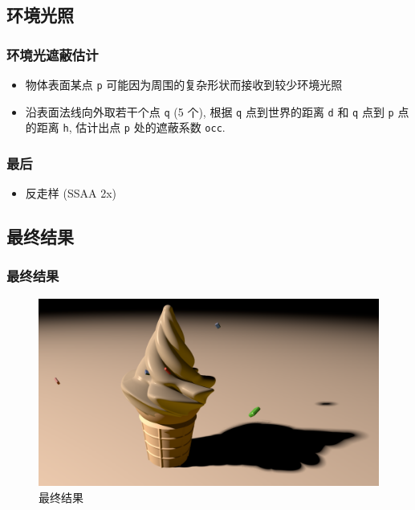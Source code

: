 \documentclass[aspectratio=169]{ctexbeamer} %
\begin{document}
\subsection{环境光照}
\begin{frame}
    \frametitle{环境光遮蔽估计}
    \begin{itemize}[<+->]
        \item 物体表面某点 \texttt{p} 可能因为周围的复杂形状而接收到较少环境光照
        \item 沿表面法线向外取若干个点 \texttt{q} (5 个), 根据 \texttt{q} 点到世界的距离 \texttt{d} 和 \texttt{q} 点到 \texttt{p} 点的距离 \texttt{h}, 估计出点 \texttt{p} 处的遮蔽系数 \texttt{occ}.
    \end{itemize}
\end{frame}

\begin{frame}
    \frametitle{最后}
    \begin{itemize}
        \item 反走样 (SSAA 2x)
    \end{itemize}
\end{frame}

\subsection{最终结果}
\begin{frame}
    \frametitle{最终结果}
    \begin{figure}[htbp]
        \centering
        \includegraphics[height=.75\textheight]{images/pre/full.pdf}
        \caption{最终结果}
        \label{fig:final}
    \end{figure}
\end{frame}
\end{document}
